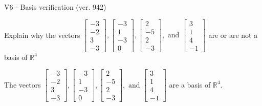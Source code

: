 \begin{exercise}
  \begin{exerciseTitle}V6 - Basis verification (ver. 942)\end{exerciseTitle}
  \begin{exerciseStatement}
    Explain why the vectors \(\left[\begin{array}{r}
-3 \\
-2 \\
3 \\
-3
\end{array}\right] , \left[\begin{array}{r}
-3 \\
1 \\
-3 \\
0
\end{array}\right] , \left[\begin{array}{r}
2 \\
-5 \\
2 \\
-3
\end{array}\right] , \text{ and } \left[\begin{array}{r}
3 \\
1 \\
4 \\
-1
\end{array}\right]\) are or are not a basis of \(\mathbb{R}^4\)	


  \end{exerciseStatement}
  \begin{exerciseAnswer}
   The vectors \(\left[\begin{array}{r}
-3 \\
-2 \\
3 \\
-3
\end{array}\right] , \left[\begin{array}{r}
-3 \\
1 \\
-3 \\
0
\end{array}\right] , \left[\begin{array}{r}
2 \\
-5 \\
2 \\
-3
\end{array}\right] , \text{ and } \left[\begin{array}{r}
3 \\
1 \\
4 \\
-1
\end{array}\right]\) 
  	 are  a basis of \(\mathbb{R}^4\).
  


  \end{exerciseAnswer}
\end{exercise}